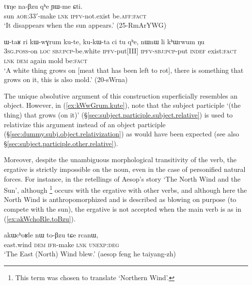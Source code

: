  
 
\begin{exe}
\ex \label{ex:tANe.naBzu}
\gll tɤŋe na-βzu qʰe ɲɯ-me ɕti. \\
sun \textsc{aor}:3\fl{}3$'$-make \textsc{lnk} \textsc{ipfv}-not.exist be.\textsc{aff}:\textsc{fact} \\
\glt `It disappears when the sun appears.' (25-RmArYWG)
\end{exe}

\begin{exe}
\ex \label{ex:kWwGrum.kute}
\gll  ɯ-taʁ ri kɯ-wɣrum ku-te, ku-kɯ-ta ci tu qʰe, nɯnɯ li kʰɯrwum ŋu \\ 
\textsc{3sg}.\textsc{poss}-on \textsc{loc} \textsc{sbj}:\textsc{pcp}-be.white \textsc{ipfv}-put[III] \textsc{ipfv}-\textsc{sbj}:\textsc{pcp}-put \textsc{indef} exist:\textsc{fact} \textsc{lnk} \textsc{dem} again mold be:\textsc{fact} \\
\glt `A white thing grows on [meat that has been left to rot], there is something that grows on it, this is also mold.' (20-sWrna)
\end{exe}

The unique absolutive argument of this construction superficially resembles an object. However, in (\ref{ex:kWwGrum.kute}), note that the subject participle  `(the thing) that grows (on it)' (§\ref{sec:subject.participle.subject.relative}) is used to relativize this argument instead of an object participle (§\ref{sec:dummy.subj.object.relativization}) as would have been expected (see also §\ref{sec:subject.participle.other.relative}).

Moreover, despite the unambiguous morphological transitivity of the verb, the ergative is strictly impossible on the noun,  even in the case of personified natural forces. For instance, in the retellings of Aesop's story `The North Wind and the Sun', although  \footnote{This term was chosen to translate `Northern Wind'.} occurs with the ergative with other verbs, and although here the North Wind is anthropomorphized and is described as blowing on purpose (to compete with the sun), the ergative is not accepted when the main verb is  as in (\ref{ex:akWchoRle.toBzu}).

\begin{exe}
\ex \label{ex:akWchoRle.toBzu}
\gll akɯcʰoʁle nɯ to-βzu tɕe rcanɯ, \\
east.wind \textsc{dem} \textsc{ifr}-make \textsc{lnk} \textsc{unexp}:\textsc{deg} \\
\glt `The East (North) Wind blew.' (aesop feng he taiyang-zh)
\end{exe}


